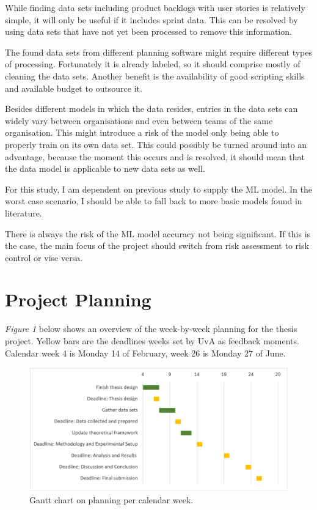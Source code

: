 \documentclass[sigconf]{acmart}
\begin{document}
While finding data sets including product backlogs with user stories is relatively simple, it will only be useful if it includes sprint data. This can be resolved by using data sets that have not yet been processed to remove this information.

The found data sets from different planning software might require different types of processing. Fortunately it is already labeled, so it should comprise mostly of cleaning the data sets. Another benefit is the availability of good scripting skills and available budget to outsource it.

Besides different models in which the data resides, entries in the data sets can widely vary between organisations and even between teams of the same organisation. This might introduce a risk of the model only being able to properly train on its own data set. This could possibly be turned around into an advantage, because the moment this occurs and is resolved, it should mean that the data model is applicable to new data sets as well.

For this study, I am dependent on previous study to supply the ML model. In the worst case scenario, I should be able to fall back to more basic models found in literature.

There is always the risk of the ML model accuracy not being significant. If this is the case, the main focus of the project should switch from risk assessment to risk control or vise versa.


\section{Project Planning}

\emph{Figure 1} below shows an overview of the week-by-week planning for the thesis project. Yellow bars are the deadlines weeks set by UvA as feedback moments. Calendar week 4 is Monday 14 of February, week 26 is Monday 27 of June. 

\begin{figure}[h]
  \centering
  \includegraphics[width=\linewidth]{gantt-planning}
  \caption{Gantt chart on planning per calendar week.}
\end{figure}
\end{document}
